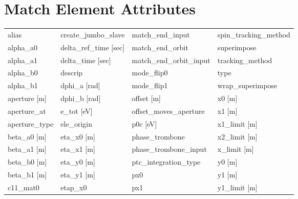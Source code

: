  \section{Match Element Attributes}
 \label{s:list.match}
 
 \begin{tabular}{llll} \toprule
alias                            & create_jumbo_slave               & match_end_input                  & spin_tracking_method             \\
alpha_a0                         & delta_ref_time [sec]             & match_end_orbit                  & superimpose                      \\
alpha_a1                         & delta_time [sec]                 & match_end_orbit_input            & tracking_method                  \\
alpha_b0                         & descrip                          & mode_flip0                       & type                             \\
alpha_b1                         & dphi_a [rad]                     & mode_flip1                       & wrap_superimpose                 \\
aperture [m]                     & dphi_b [rad]                     & offset [m]                       & x0 [m]                           \\
aperture_at                      & e_tot [eV]                       & offset_moves_aperture            & x1 [m]                           \\
aperture_type                    & ele_origin                       & p0c [eV]                         & x1_limit [m]                     \\
beta_a0 [m]                      & eta_x0 [m]                       & phase_trombone                   & x2_limit [m]                     \\
beta_a1 [m]                      & eta_x1 [m]                       & phase_trombone_input             & x_limit [m]                      \\
beta_b0 [m]                      & eta_y0 [m]                       & ptc_integration_type             & y0 [m]                           \\
beta_b1 [m]                      & eta_y1 [m]                       & px0                              & y1 [m]                           \\
c11_mat0                         & etap_x0                          & px1                              & y1_limit [m]                     \\

\end{tabular}
